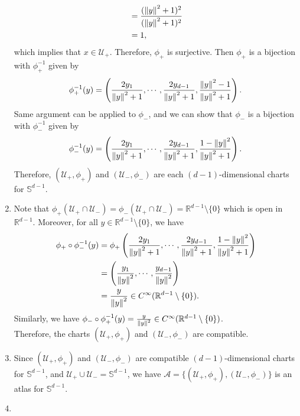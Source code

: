 \documentclass[en, oneside]{assignment}
\begin{document}
\begin{sol}
\begin{enumerate}[label=(\arabic*)]
\begin{align*}
            &= \frac{(\left\lVert y\right\rVert^2 + 1)^2}{(\left\lVert y\right\rVert^2 + 1)^2}\\
            &= 1,
        \end{align*}
        which implies that $x \in \mathcal U _+$. Therefore, $\phi _+$ is surjective. Then $\phi _+$ is a bijection with $\phi _+^{-1}$ given by
        \begin{equation*}
            \phi _+^{-1} (y) = \left(\frac{2 y_1}{\left\lVert y\right\rVert^2 + 1}, \cdots, \frac{2 y_{d-1}}{\left\lVert y\right\rVert^2 + 1}, \frac{\left\lVert y\right\rVert^2 - 1}{\left\lVert y\right\rVert^2 + 1}\right).
        \end{equation*}
        Same argument can be applied to $\phi _-$, and we can show that $\phi _-$ is a bijection with $\phi _-^{-1}$ given by
        \begin{equation*}
            \phi _-^{-1} (y) = \left(\frac{2 y_1}{\left\lVert y\right\rVert^2 + 1}, \cdots, \frac{2 y_{d-1}}{\left\lVert y\right\rVert^2 + 1}, \frac{1 - \left\lVert y\right\rVert^2}{\left\lVert y\right\rVert^2 + 1}\right).
        \end{equation*}
        Therefore, $(\mathcal U _+, \phi _+)$ and $(\mathcal U _-, \phi _-)$ are each $(d-1)$-dimensional charts for $\mathbb S ^{d-1}$.
        \item Note that $\phi _+ (\mathcal U _+ \cap \mathcal U _-) = \phi _- (\mathcal U _+ \cap \mathcal U _-) = \mathbb R ^{d-1} \setminus \{0\}$ 
        which is open in $\mathbb R ^{d-1}$. Moreover, for all $y \in \mathbb R ^{d-1} \setminus \{0\}$, we have
        \begin{align*}
            \phi _+ \circ \phi _-^{-1} (y) &= \phi _+ 
            \left(\frac{2 y_1}{\left\lVert y\right\rVert^2 + 1}, \cdots, \frac{2 y_{d-1}}{\left\lVert y\right\rVert^2 + 1}, \frac{1 - \left\lVert y\right\rVert^2}{\left\lVert y\right\rVert^2 + 1}\right)\\
            &= \left(\frac{y_1}{\left\lVert y\right\rVert^2}, \cdots, \frac{y_{d-1}}{\left\lVert y\right\rVert^2}\right)\\
            &= \frac{y}{\left\lVert y\right\rVert^2} \in C^\infty (\mathbb R ^{d-1} \setminus \{0\}).
        \end{align*}
        Similarly, we have $\phi _- \circ \phi _+^{-1} (y) = \frac{y}{\left\lVert y\right\rVert^2} \in C^\infty (\mathbb R ^{d-1} \setminus \{0\})$. \\
        Therefore, the charts $(\mathcal U _+, \phi _+)$ and $(\mathcal U _-, \phi _-)$ are compatible.
        \item Since $(\mathcal U _+, \phi _+)$ and $(\mathcal U _-, \phi _-)$ are compatible $(d-1)$-dimensional charts for $\mathbb S ^{d-1}$,
        and $\mathcal U _+ \cup \mathcal U _- = \mathbb S ^{d-1}$, 
        we have $\mathcal A = \{(\mathcal U _+, \phi _+), (\mathcal U _-, \phi _-)\}$ is an atlas for $\mathbb S ^{d-1}$.
        \item
    \end{enumerate}
\end{sol}
\end{document}

